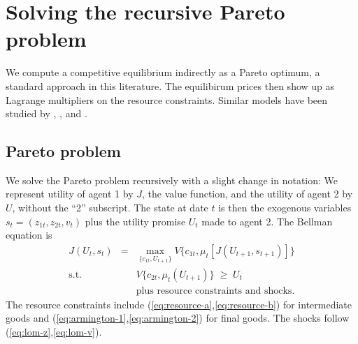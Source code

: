 
\section{Solving the recursive Pareto problem}


We compute a competitive equilibrium indirectly as a Pareto optimum,
a standard approach in this literature.
The equilibirum prices then show up as Lagrange multipliers on the resource constraints.
Similar models have been studied by \citet{Colacito2013-yq},
\citet{Kollmann2015-sy}, and \citet{Tretvoll2011-lo}.


\subsection*{Pareto problem}

We solve the Pareto problem recursively with a slight change in notation:
We represent utility of agent 1 by $J$, the value function,
and the utility of agent 2 by $U$, without the ``2'' subscript.
The state at date $t$ is then the exogenous variables $s_t = ( z_{1t}, z_{2t}, v_t ) $
plus the utility promise $U_{t}$ made to agent 2.
The Bellman equation is
\begin{eqnarray*}
    J(U_t, s_t) &=& \max_{\{c_{1t}, U_{t+1} \}}  V \big\{ c_{1t}, \mu_t [J(U_{t+1}, s_{t+1})] \big\} \\
    \mbox{s.t.} && V \big\{ c_{2t}, \mu_t (U_{t+1}) \big\} \;\geq\; U_{t} \\
            && \mbox{plus resource constraints and shocks} .
\end{eqnarray*}
The resource constraints include (\ref{eq:resource-a},\ref{eq:resource-b}) for intermediate goods
and (\ref{eq:armington-1},\ref{eq:armington-2}) for final goods.
The shocks follow (\ref{eq:lom-z},\ref{eq:lom-v}).

